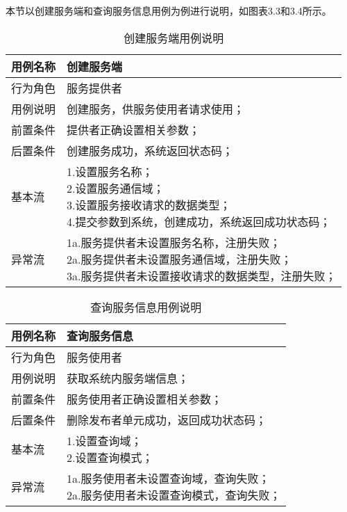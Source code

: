 本节以创建服务端和查询服务信息用例为例进行说明，如图表3.3和3.4所示。
\begin{table}[H]
  \centering\small
  \renewcommand\arraystretch{1.2}
  \caption{创建服务端用例说明}
  \label{tab:exampletable}
  \begin{tabular}{ll}
    \toprule
    \multicolumn{1}{l}{用例名称} & \multicolumn{1}{l}{创建服务端}  \\
    \midrule
    行为角色 & 服务提供者\\
    用例说明 & 创建服务，供服务使用者请求使用；\\
    前置条件 & 提供者正确设置相关参数；\\
    后置条件 & 创建服务成功，系统返回状态码；\\
    基本流   & \makecell[l]{1.设置服务名称；\\2.设置服务通信域；\\3.设置服务接收请求的数据类型；\\4.提交参数到系统，创建成功，系统返回成功状态码；}\\
    异常流   & \makecell[l]{1a.服务提供者未设置服务名称，注册失败；\\2a.服务提供者未设置服务通信域，注册失败；\\3a.服务提供者未设置接收请求的数据类型，注册失败；}\\
    \bottomrule
  \end{tabular}
\end{table}
\begin{table}[H]
  \centering\small
  \renewcommand\arraystretch{1.2}
  \caption{查询服务信息用例说明}
  \label{tab:exampletable}
  \begin{tabular}{ll}
    \toprule
    \multicolumn{1}{l}{用例名称} & \multicolumn{1}{l}{查询服务信息}  \\
    \midrule
    行为角色 & 服务使用者\\
    用例说明 & 获取系统内服务端信息；\\
    前置条件 & 服务使用者正确设置相关参数；\\
    后置条件 & 删除发布者单元成功，返回成功状态码；\\
    基本流   & \makecell[l]{1.设置查询域；\\2.设置查询模式；}\\
    异常流   & \makecell[l]{1a.服务使用者未设置查询域，查询失败；\\2a.服务使用者未设置查询模式，查询失败；}\\
    \bottomrule
  \end{tabular}
\end{table}


